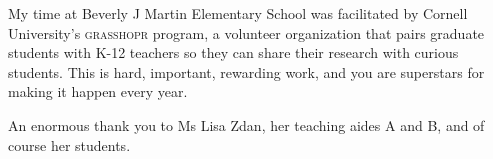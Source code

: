 \documentclass[sigplan,review]{acmart}
\begin{document}
My time at Beverly J Martin Elementary School was facilitated by Cornell University's \textsc{grasshopr} program, a volunteer organization that pairs graduate students with K-12 teachers so they can share their research with curious students.
This is hard, important, rewarding work, and you are superstars for making it happen every year.

An enormous thank you to Ms Lisa Zdan, her teaching aides A and B, and of course her students.

\appendix



\end{document}
